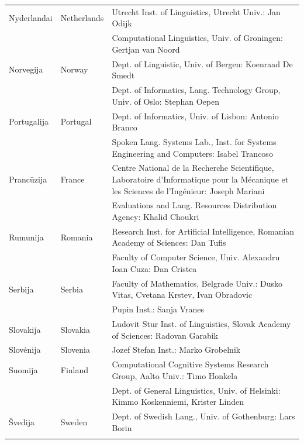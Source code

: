 \documentclass[]{../metanetpaper}
\begin{document}
\begin{longtable}{llp{105mm}}
  Nyderlandai & \textcolor{grey1}{Netherlands} & Utrecht Inst. of Linguistics, Utrecht Univ.: Jan Odijk\\ \addlinespace 
  & & Computational Linguistics, Univ. of Groningen: Gertjan van Noord\\ \addlinespace
  Norvegija & \textcolor{grey1}{Norway} & Dept. of Linguistic, Univ. of Bergen: Koenraad De Smedt\\ \addlinespace 
  & & Dept. of Informatics, Lang. Technology Group, Univ. of Oslo: Stephan Oepen \\ \addlinespace
  Portugalija & \textcolor{grey1}{Portugal} & Dept. of Informatics, Univ. of Lisbon: Antonio Branco\\ \addlinespace
  & & Spoken Lang. Systems Lab., Inst. for Systems Engineering and Computers: Isabel Trancoso \\ \addlinespace
  Prancūzija & \textcolor{grey1}{France} & Centre National de la Recherche Scientifique, Laboratoire d'Informatique pour la Mécanique et les Sciences de l'Ingénieur: Joseph Mariani \\ \addlinespace
  & & Evaluations and Lang. Resources Distribution Agency: Khalid Choukri\\ \addlinespace 
  Rumunija & \textcolor{grey1}{Romania} & Research Inst. for Artificial Intelligence, Romanian Academy of Sciences: Dan Tufis \\ \addlinespace
  & & Faculty of Computer Science, Univ. Alexandru Ioan Cuza: Dan Cristea \\ \addlinespace
  Serbija & \textcolor{grey1}{Serbia} & Faculty of Mathematics, Belgrade Univ.: Dusko Vitas, Cvetana Krstev, Ivan Obradovic \\ \addlinespace
  & & Pupin Inst.: Sanja Vranes \\ \addlinespace  
  Slovakija & \textcolor{grey1}{Slovakia} & Ludovit Stur Inst. of Linguistics, Slovak Academy of Sciences: Radovan Garabik \\ \addlinespace 
  Slovėnija & \textcolor{grey1}{Slovenia} & Jozef Stefan Inst.: Marko Grobelnik \\ \addlinespace 
 Suomija & \textcolor{grey1}{Finland} & Computational Cognitive Systems Research Group, Aalto Univ.: Timo Honkela\\ \addlinespace
  & & Dept. of General Linguistics, Univ. of Helsinki: Kimmo Koskenniemi, Krister Linden \\ \addlinespace
  Švedija & \textcolor{grey1}{Sweden} & Dept. of Swedish Lang., Univ. of Gothenburg: Lars Borin \\ \addlinespace 

\end{longtable}
\end{document}
